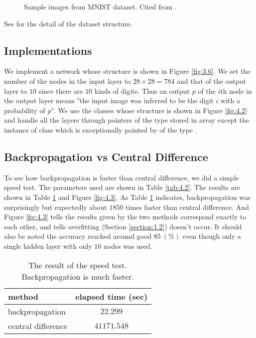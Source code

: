 \documentclass{article}
\theoremstyle{definition}
\newcommand{\sect}[1]{Section \ref{section:#1}}
\newcommand{\fig}[1]{Figure \ref{fig:#1}}
\newcommand{\tab}[1]{Table \ref{tab:#1}}
\begin{document}
\begin{figure}[H]
    \centering
    \begin{subfigure}[H]{1.0\textwidth}
	\end{subfigure}
    \caption{Sample images from MNIST dataset. Cited from \cite{8}.}
    \label{fig:4.1}
\end{figure}

See \href{../read\_mnist/README.md}{} for the detail of the dataset structure.

\subsection{Implementations} \label{section:4.2}

We implement a network whose structure is shown in \fig{3.6}. We set the number of the nodes in the input layer to $28 \times 28 = 784$ and that of the output layer to $10$ since there are $10$ kinds of digits. Thus an output $p$ of the $i$th node in the output layer means "the input image was inferred to be the digit $i$ with a probability of $p$". We use the classes whose structure is shown in \fig{4.2} and handle all the layers through pointers of the type  stored in  array except the instance of  class which is exceptionally pointed by  of the type .

\subsection{Backpropagation vs Central Difference}

To see how backpropagation is faster than central difference, we did a simple speed test. The parameters used are shown in \tab{4.2}. The results are shown in \tab{4.1} and \fig{4.3}. As \tab{4.1} indicates, backpropagation was surprisingly but expectedly about $1850$ times faster than central difference. And \fig{4.3} tells the results given by the two methods correspond exactly to each other, and tells overfitting (\sect{1.2}) doesn't occur. It should also be noted the accuracy reached around good $85\ (\%)$ even though only a single hidden layer with only $10$ nodes was used.

\begin{table}[H]
    \centering
    \begin{tabular}{|l|c|} \hline
    method & elapsed time (sec) \\ \hline
    backpropagation & $22.299$ \\ \hline
    central difference & $41171.548$ \\ \hline
    \end{tabular}
    \caption{The result of the speed test. Backpropagation is much faster.}
    \label{tab:4.1}
\end{table}
\end{document}
